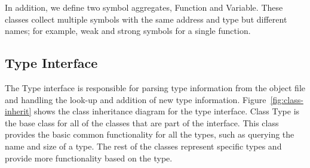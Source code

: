 In addition, we define two symbol aggregates, Function and Variable. These classes collect multiple symbols with the same address and type but different names; for example, weak and strong symbols for a single function.

\subsection{Type Interface}
\label{subsec:typeInterface}
 The Type interface is responsible for parsing type information from the object file and handling the look-up and addition of new type information. Figure~\ref{fig:class-inherit} shows the class inheritance diagram for the type interface. Class Type is the base class for all of the classes that are part of the interface. This class provides the basic common functionality for all the types, such as querying the name and size of a type. The rest of the classes represent specific types and provide more functionality based on the type.

